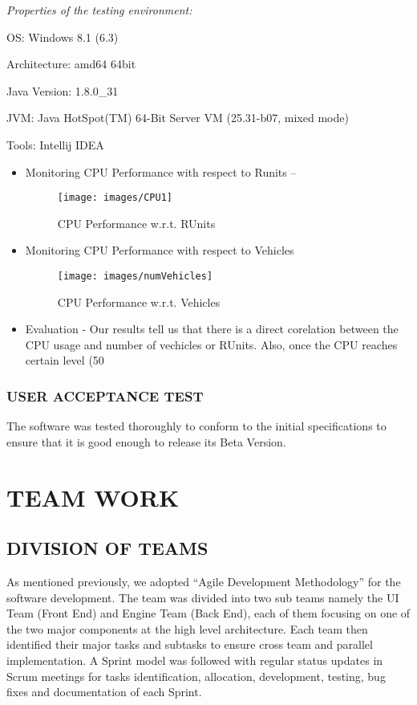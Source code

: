 \documentclass[11pt,a4paper]{article}
\begin{document}
	\setlength{\parindent}{0cm}\bigskip
	\textit{Properties of the testing environment:}
	
	\setlength{\parindent}{1cm}
	OS: Windows 8.1 (6.3)
	
	Architecture: amd64 64bit
	
	Java Version: 1.8.0\_31
	
	JVM: Java HotSpot(TM) 64-Bit Server VM (25.31-b07, mixed mode)
	
	Tools: Intellij IDEA
	
	\begin{itemize}
		\item Monitoring CPU Performance with respect to Runits –
		\begin{figure}[h!]
			\texttt{[image: images/CPU1]}
			\caption{CPU Performance w.r.t. RUnits}
			\centering
		\end{figure} 
		
		\item Monitoring CPU Performance with respect to Vehicles
		
		\begin{figure}[h!]
			\texttt{[image: images/numVehicles]}
			\caption{CPU Performance w.r.t. Vehicles}
			\centering
		\end{figure}
		
		\item Evaluation - Our results tell us that there is a direct corelation between the CPU usage and number of vechicles or RUnits. Also, once the CPU reaches certain level (50%
	\end{itemize}
	
	\subsubsection{USER ACCEPTANCE TEST}
	The software was tested thoroughly to conform to the initial specifications to ensure that it is good enough to release its Beta Version.

\section{TEAM WORK}
  \subsection{DIVISION OF TEAMS}
  As mentioned previously, we adopted “Agile Development Methodology”
  for the software development. The team was divided into two sub teams
  namely the UI Team (Front End) and Engine Team (Back End), each of
  them focusing on one of the two major components at the high level
  architecture. Each team then identified their major tasks and
  subtasks to ensure cross team and parallel implementation. A Sprint model was followed with regular status updates in Scrum
  meetings for tasks identification, allocation, development, testing,
  bug fixes and documentation of each Sprint.
  
\end{document}
